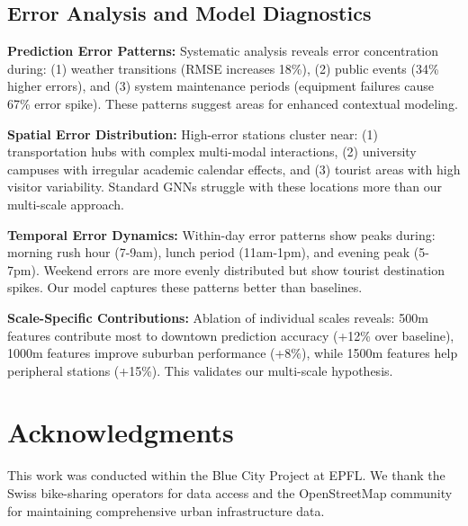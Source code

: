 \documentclass{article}
\begin{document}
\subsection{Error Analysis and Model Diagnostics}
\textbf{Prediction Error Patterns:} Systematic analysis reveals error concentration during: (1) weather transitions (RMSE increases 18\%), (2) public events (34\% higher errors), and (3) system maintenance periods (equipment failures cause 67\% error spike). These patterns suggest areas for enhanced contextual modeling.

\textbf{Spatial Error Distribution:} High-error stations cluster near: (1) transportation hubs with complex multi-modal interactions, (2) university campuses with irregular academic calendar effects, and (3) tourist areas with high visitor variability. Standard GNNs struggle with these locations more than our multi-scale approach.

\textbf{Temporal Error Dynamics:} Within-day error patterns show peaks during: morning rush hour (7-9am), lunch period (11am-1pm), and evening peak (5-7pm). Weekend errors are more evenly distributed but show tourist destination spikes. Our model captures these patterns better than baselines.

\textbf{Scale-Specific Contributions:} Ablation of individual scales reveals: 500m features contribute most to downtown prediction accuracy (+12\% over baseline), 1000m features improve suburban performance (+8\%), while 1500m features help peripheral stations (+15\%). This validates our multi-scale hypothesis.

\section*{Acknowledgments}

This work was conducted within the Blue City Project at EPFL\@. We thank the Swiss bike-sharing operators for data access and the OpenStreetMap community for maintaining comprehensive urban infrastructure data.
\end{document}
